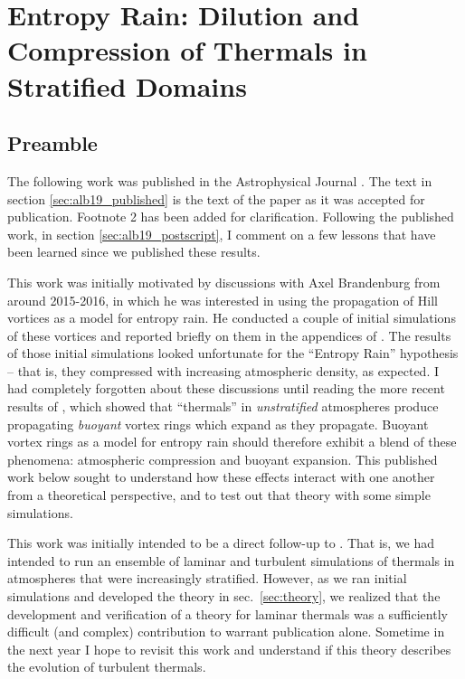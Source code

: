 \chapter{Entropy Rain: Dilution and Compression of Thermals in Stratified Domains}
\label{ch:alb19}

\section{Preamble}
The following work was published in the Astrophysical Journal \citep{andersLB2019}.
The text in section \ref{sec:alb19_published} is the text of the paper as it was accepted for publication.
Footnote 2 has been added for clarification.
Following the published work, in section \ref{sec:alb19_postscript}, I comment on a few lessons that have been learned since we published these results.

This work was initially motivated by discussions with Axel Brandenburg from around 2015-2016, in which he was interested in using the propagation of Hill vortices as a model for entropy rain.
He conducted a couple of initial simulations of these vortices and reported briefly on them in the appendices of \citet	{brandenburg2016}.
The results of those initial simulations looked unfortunate for the ``Entropy Rain'' hypothesis -- that is, they compressed with increasing atmospheric density, as expected.
I had completely forgotten about these discussions until reading the more recent results of \citet{lecoanet&jeevanjee2019}, which showed that ``thermals'' in \emph{unstratified} atmospheres produce propagating \emph{buoyant} vortex rings which expand as they propagate.
Buoyant vortex rings as a model for entropy rain should therefore exhibit a blend of these phenomena: atmospheric compression and buoyant expansion.
This published work below sought to understand how these effects interact with one another from a theoretical perspective, and to test out that theory with some simple simulations.

This work was initially intended to be a direct follow-up to \citet{lecoanet&jeevanjee2019}.
That is, we had intended to run an ensemble of laminar and turbulent simulations of thermals in atmospheres that were increasingly stratified.
However, as we ran initial simulations and developed the theory in sec.~\ref{sec:theory}, we realized that the development and verification of a theory for laminar thermals was a sufficiently difficult (and complex) contribution to warrant publication alone.
Sometime in the next year I hope to revisit this work and understand if this theory describes the evolution of turbulent thermals.


